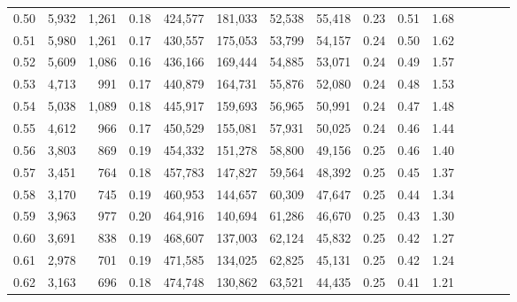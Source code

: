 \begin{tabular}{rrrcrrrrrrrrrrr}
0.50 &   5,932 &   1,261 &                                       0.18 &  424,577 &  181,033 &   52,538 &   55,418 &  0.23 &  0.51 &                         1.68 \\
0.51 &   5,980 &   1,261 &                                       0.17 &  430,557 &  175,053 &   53,799 &   54,157 &  0.24 &  0.50 &                         1.62 \\
0.52 &   5,609 &   1,086 &                                       0.16 &  436,166 &  169,444 &   54,885 &   53,071 &  0.24 &  0.49 &                         1.57 \\
0.53 &   4,713 &     991 &                                       0.17 &  440,879 &  164,731 &   55,876 &   52,080 &  0.24 &  0.48 &                         1.53 \\
0.54 &   5,038 &   1,089 &                                       0.18 &  445,917 &  159,693 &   56,965 &   50,991 &  0.24 &  0.47 &                         1.48 \\
0.55 &   4,612 &     966 &                                       0.17 &  450,529 &  155,081 &   57,931 &   50,025 &  0.24 &  0.46 &                         1.44 \\
0.56 &   3,803 &     869 &                                       0.19 &  454,332 &  151,278 &   58,800 &   49,156 &  0.25 &  0.46 &                         1.40 \\
0.57 &   3,451 &     764 &                                       0.18 &  457,783 &  147,827 &   59,564 &   48,392 &  0.25 &  0.45 &                         1.37 \\
0.58 &   3,170 &     745 &                                       0.19 &  460,953 &  144,657 &   60,309 &   47,647 &  0.25 &  0.44 &                         1.34 \\
0.59 &   3,963 &     977 &                                       0.20 &  464,916 &  140,694 &   61,286 &   46,670 &  0.25 &  0.43 &                         1.30 \\
0.60 &   3,691 &     838 &                                       0.19 &  468,607 &  137,003 &   62,124 &   45,832 &  0.25 &  0.42 &                         1.27 \\
0.61 &   2,978 &     701 &                                       0.19 &  471,585 &  134,025 &   62,825 &   45,131 &  0.25 &  0.42 &                         1.24 \\
0.62 &   3,163 &     696 &                                       0.18 &  474,748 &  130,862 &   63,521 &   44,435 &  0.25 &  0.41 &                         1.21 \\

\end{tabular}
